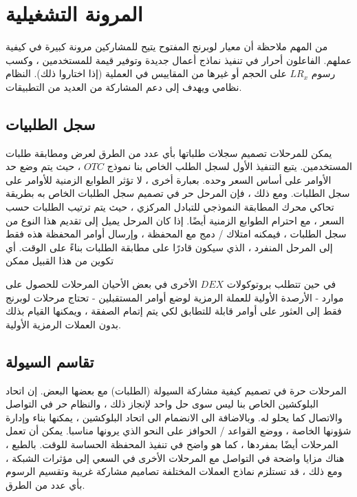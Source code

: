 \documentclass[12pt, a4paper, leqno]{report}
\theoremstyle{plain}
\theoremstyle{definition}
\begin{document}
\chapter{المرونة التشغيلية}
\begin{multicols}{2}
\begin{otherlanguage}{arabic}
من المهم ملاحظة أن معيار لوبرنج المفتوح يتيح للمشاركين مرونة كبيرة في كيفية عملهم. الفاعلون أحرار في تنفيذ نماذج أعمال جديدة وتوفير قيمة للمستخدمين ، وكسب رسوم $LR_x$ على الحجم أو غيرها من المقاييس في العملية (إذا اختاروا ذلك). النظام نظامي ويهدف إلى دعم المشاركة من العديد من التطبيقات.
\end{otherlanguage}
\section{سجل الطلبيات}
\begin{otherlanguage}{arabic}
يمكن للمرحلات تصميم سجلات طلباتها بأي عدد من الطرق لعرض ومطابقة طلبات المستخدمين. يتبع التنفيذ الأول لسجل الطلب الخاص بنا نموذج $OTC$ ، حيث يتم وضع حد الأوامر على أساس السعر وحده. بعبارة أخرى ، لا تؤثر الطوابع الزمنية للأوامر على سجل الطلبات. ومع ذلك ، فإن المرحل حر في تصميم سجل الطلبات الخاص به بطريقة تحاكي محرك المطابقة النموذجي للتبادل المركزي ، حيث يتم ترتيب الطلبات حسب السعر ، مع احترام الطوابع الزمنية أيضًا. إذا كان المرحل يميل إلى تقديم هذا النوع من سجل الطلبات ، فيمكنه امتلاك / دمج مع المحفظة ، وإرسال أوامر المحفظة هذه فقط إلى المرحل المنفرد ، الذي سيكون قادرًا على مطابقة الطلبات بناءً على الوقت. أي تكوين من هذا القبيل ممكن

في حين تتطلب بروتوكولات $DEX$ الأخرى في بعض الأحيان المرحلات للحصول على موارد - الأرصدة الأولية للعملة الرمزية لوضع أوامر المستقبلين - تحتاج مرحلات لوبرنج  فقط إلى العثور على أوامر قابلة للتطابق لكي يتم إتمام الصفقة ، ويمكنها القيام بذلك بدون العملات الرمزية الأولية.
\end{otherlanguage}
\section{تقاسم السيولة}
\begin{otherlanguage}{arabic}
المرحلات حرة في تصميم كيفية مشاركة السيولة (الطلبات) مع بعضها البعض. إن اتحاد البلوكشين الخاص بنا ليس سوى حل واحد لإنجاز ذلك ، والنظام حر في التواصل والاتصال كما يحلو له. وبالاضافة الى الانضمام الى اتحاد البلوكشين ، يمكنها بناء وإدارة شؤونها الخاصة ، ووضع القواعد / الحوافز على النحو الذي يرونها مناسبا. يمكن أن تعمل المرحلات أيضًا بمفردها ، كما هو واضح في تنفيذ المحفظة الحساسة للوقت. بالطبع ، هناك مزايا واضحة في التواصل مع المرحلات الأخرى في السعي إلى مؤثرات الشبكة ، ومع ذلك ، قد تستلزم نماذج العملات المختلفة تصاميم مشاركة غريبة وتقسيم الرسوم بأي عدد من الطرق.
\end{otherlanguage}
\end{multicols}
\end{document}
